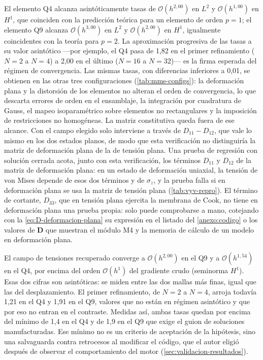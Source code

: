 El elemento Q4 alcanza asintóticamente tasas de $\mathcal{O}(h^{2{,}00})$ en $L^2$ y $\mathcal{O}(h^{1{,}00})$ en $H^1$, que coinciden con la predicción teórica para un elemento de orden $p=1$; el elemento Q9 alcanza $\mathcal{O}(h^{3{,}00})$ en $L^2$ y $\mathcal{O}(h^{2{,}00})$ en $H^1$, igualmente coincidentes con la teoría para $p=2$. La aproximación progresiva de las tasas a su valor asintótico ---por ejemplo, el Q4 pasa de 1,82 en el primer refinamiento ($N=2$ a $N=4$) a 2,00 en el último ($N=16$ a $N=32$)--- es la firma esperada del régimen de convergencia. Las mismas tasas, con diferencias inferiores a 0,01, se obtienen en las otras tres configuraciones (\autoref{tab:mms-configs}): la deformación plana y la distorsión de los elementos no alteran el orden de convergencia, lo que descarta errores de orden en el ensamblaje, la integración por cuadratura de Gauss, el mapeo isoparamétrico sobre elementos no rectangulares y la imposición de restricciones no homogéneas. La matriz constitutiva queda fuera de ese alcance. Con el campo elegido solo interviene a través de $D_{11}-D_{12}$, que vale lo mismo en los dos estados planos, de modo que esta verificación no distinguiría la matriz de deformación plana de la de tensión plana. Una prueba de regresión con solución cerrada acota, junto con esta verificación, los términos $D_{11}$ y $D_{12}$ de la matriz de deformación plana: en un estado de deformación uniaxial, la tensión de von Mises depende de esos dos términos y de $\sigma_z$, y la prueba falla si en deformación plana se usa la matriz de tensión plana (\autoref{tab:vyv-repro}). El término de cortante, $D_{33}$, que en tensión plana ejercita la membrana de Cook, no tiene en deformación plana una prueba propia: solo puede comprobarse a mano, cotejando con la \autoref{eq:D-deformacion-plana} su expresión en el listado del \autoref{anexo:codigo} o los valores de $\bm{D}$ que muestran el módulo M4 y la memoria de cálculo de un modelo en deformación plana.

El campo de tensiones recuperado converge a $\mathcal{O}(h^{2{,}00})$ en el Q9 y a $\mathcal{O}(h^{1{,}54})$ en el Q4, por encima del orden $\mathcal{O}(h^{1})$ del gradiente crudo (seminorma $H^1$). Esas dos cifras son asintóticas: se miden entre las dos mallas más finas, igual que las del desplazamiento. El primer refinamiento, de $N=2$ a $N=4$, arroja todavía 1,21 en el Q4 y 1,91 en el Q9, valores que no están en régimen asintótico y que por eso no entran en el contraste. Medidas así, ambas tasas quedan por encima del mínimo de 1,4 en el Q4 y de 1,9 en el Q9 que exige el guion de soluciones manufacturadas. Ese mínimo no es un criterio de aceptación de la hipótesis, sino una salvaguarda contra retrocesos al modificar el código, que el autor eligió después de observar el comportamiento del motor (\autoref{sec:validacion-resultados}).

